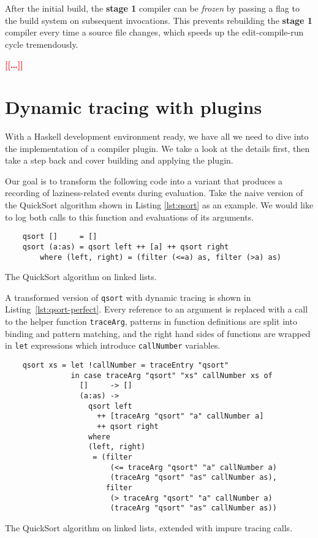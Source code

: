 \documentclass[thesis=B,english]{FITthesis}[2019/12/23]
\newcommand{\todo}[1]{\textcolor{red}{\textbf{[[#1]]}}}
\newcommand{\hsIdent}[1]{\texttt{#1}}
\newcommand{\hsCode}[1]{\texttt{#1}}
\begin{document}
After the initial build, the \textbf{stage 1} compiler can be \textit{frozen}
by passing a flag to the build system on subsequent invocations. This prevents
rebuilding the \textbf{stage 1} compiler every time a source file changes, which
speeds up the edit-compile-run cycle tremendously.

\todo{\ldots}

\section{Dynamic tracing with plugins}
With a Haskell development environment ready, we have all we need to dive into
the implementation of a compiler plugin. We take a look at the details first,
then take a step back and cover building and applying the plugin.

Our goal is to transform the following code into a variant that produces a
recording of laziness-related events during evaluation. Take the naive version
of the QuickSort algorithm shown in Listing \ref{lst:qsort} as an example. We
would like to log both calls to this function and evaluations of its arguments.

\begin{listing}[h]
	\centering
	\begin{verbatim}
	qsort []     = []
	qsort (a:as) = qsort left ++ [a] ++ qsort right
	    where (left, right) = (filter (<=a) as, filter (>a) as)
	\end{verbatim}
	\caption{The QuickSort algorithm on linked lists.}
	\label{lst:qsort}
\end{listing}

A transformed version of \hsIdent{qsort} with dynamic tracing is shown in
Listing~\ref{lst:qsort-perfect}. Every reference to an argument is replaced
with a call to the helper function \hsIdent{traceArg}, patterns in function
definitions are split into binding and pattern matching, and the right hand
sides of functions are wrapped in \hsCode{let} expressions which introduce
\hsIdent{callNumber} variables.

\begin{listing}[h]
	\centering
	\begin{verbatim}
	qsort xs = let !callNumber = traceEntry "qsort"
	           in case traceArg "qsort" "xs" callNumber xs of
	             []     -> []
	             (a:as) ->
	               qsort left
	                 ++ [traceArg "qsort" "a" callNumber a]
	                 ++ qsort right
	               where
	               (left, right)
	                = (filter
	                    (<= traceArg "qsort" "a" callNumber a)
	                    (traceArg "qsort" "as" callNumber as),
	                   filter
	                    (> traceArg "qsort" "a" callNumber a)
	                    (traceArg "qsort" "as" callNumber as))
	\end{verbatim}
	\caption[The QuickSort algorithm, rewritten.]{The QuickSort algorithm on
	linked lists, extended with impure tracing calls.}
	\label{lst:qsort-perfect}
\end{listing}
\end{document}
